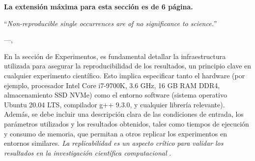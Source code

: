 \begin{mdframed}
    \textbf{La extensión máxima para esta sección es de 6 página.}
\end{mdframed}


\epigraph{``\textit{Non-reproducible single occurrences are of no significance to
science.}''}{---\citeauthor{popper2005logic},\citeyear{popper2005logic} \cite{popper2005logic}}
En la sección de Experimentos, es fundamental detallar la infraestructura utilizada para asegurar la reproducibilidad de los resultados, un principio clave en cualquier experimento científico. Esto implica especificar tanto el hardware (por ejemplo, procesador Intel Core i7-9700K, 3.6 GHz, 16 GB RAM DDR4, almacenamiento SSD NVMe) como el entorno software (sistema operativo Ubuntu 20.04 LTS, compilador g++ 9.3.0, y cualquier librería relevante). Además, se debe incluir una descripción clara de las condiciones de entrada, los parámetros utilizados y los resultados obtenidos, tales como tiempos de ejecución y consumo de memoria, que permitan a otros replicar los experimentos en entornos similares. \textit{La replicabilidad es un aspecto crítico para validar los resultados en la investigación científica computacional} \cite{inbookFonseca}.

